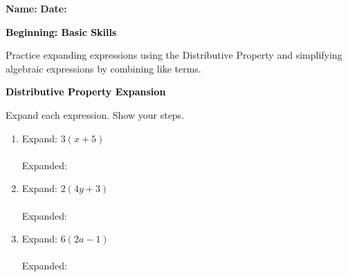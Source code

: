 \documentclass[12pt, letterpaper, fleqn]{article}
\newcommand{\blanklong}{\underline{\hspace{6.5cm}}}
\begin{document}
\textbf{Name:} \underline{\hspace{5cm}}
\hfill
\textbf{Date:} \underline{\hspace{3cm}}\\

\begin{tcolorbox}[colback=black!10]
    \large\textcolor{black}{\textbf{Beginning: Basic Skills}}
\end{tcolorbox}

\vspace{3mm}
\noindent
Practice expanding expressions using the Distributive Property and simplifying algebraic expressions by combining like terms.

\vspace{4mm}

\begin{tcolorbox}[colback=black!10]
\large\textcolor{black}{\textbf{Distributive Property Expansion}}
\end{tcolorbox}

\noindent
Expand each expression. Show your steps.

\vspace{3mm}

\begin{enumerate}[itemsep=1.5cm, leftmargin=0.6cm]

\item Expand: $3(x + 5)$ \\ \\
Expanded: \blanklong

\vspace{1.5cm}

\item Expand: $2(4y + 3)$ \\ \\
Expanded: \blanklong

\vspace{1.5cm}

\item Expand: $6(2a - 1)$ \\ \\
Expanded: \blanklong

\vspace{1.5cm}

\end{enumerate}
\end{document}
